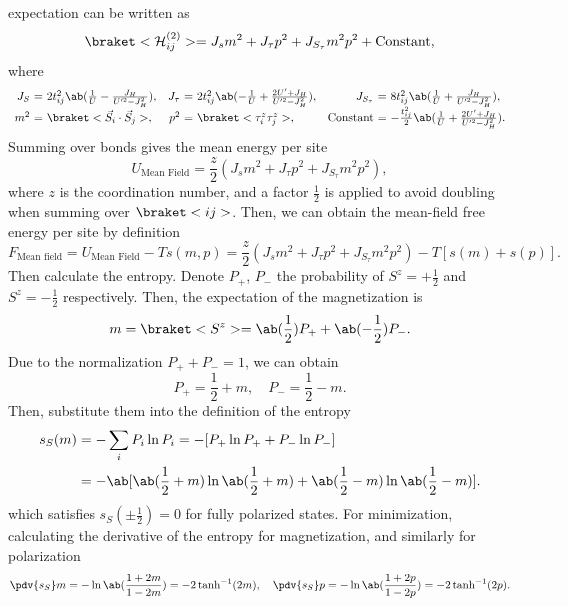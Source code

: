\begin{solution}
\begin{enumext}[label = \Roman*.]
\begin{enumext}[label = (\alph*)]
      expectation can be written as
      \[
        \braket<\mathcal H_{ij}^{(2)}>
      = J_s m^2 + J_\tau p^2 + J_{S_\tau} m^2p^2 + \text{Constant},
      \]
      where
      \[\begin{array}{*3{r@{~}c@{~}l}}
          J_S        & = & 2t_{ij}^2
                           \ab(\frac1U - \frac{J_H}{U'^2 - J_H^2}),       &
          J_\tau     & = & 2t_{ij}^2
                           \ab(-\frac1U + \frac{2U' + J_H}{U'^2 - J_H^2}),&
          J_{S_\tau} & = & 8t_{ij}^2
                           \ab(\frac1U + \frac{J_H}{U'^2 - J_H^2}),       \\
                 m^2 & = & \braket<\vec S_i \cdot \vec S_j>,              &
                 p^2 & = & \braket<\tau_i^z \tau_j^z>,                    &
     \text{Constant} & = &-\frac{t_{ij}^2}2
                           \ab(\frac 1U + \frac{2U' + J_H}{U'^2 - J_H^2}).
        \end{array}
      \]
      Summing over bonds gives the mean energy per site
      \[
        U_\text{Mean Field} = \frac{z}{2}
          (J_s m^2 + J_\tau p^2 + J_{S_\tau} m^2p^2),
      \]
      where $z$ is the coordination number, and a factor $\frac12$ is
      applied to avoid doubling when summing over $\braket<ij>$. Then, we can
      obtain the mean-field free energy per site by definition
      \[
        F_\text{Mean field} = U_\text{Mean Field} - Ts(m,p)
      = \frac z2 (J_s m^2 + J_\tau p^2 + J_{S_\tau} m^2p^2) - T[s(m) + s(p)].
      \]
      Then calculate the entropy. Denote $P_+$, $P_-$ the probability
      of $S^z = +\frac12$ and $S^z = -\frac12$ respectively. Then, the
      expectation of the magnetization is
      \[
        m = \braket<S^z> = \ab(\frac12)P_+ + \ab(-\frac12)P_-.
      \]
      Due to the normalization $P_+ + P_- = 1$, we can obtain
      \[
        P_+ = \frac12 + m, \quad P_- = \frac12 - m.
      \]
      Then, substitute them into the definition of the entropy
      \begin{align*}
        s_S(m) & = -\sum_i P_i \ln P_i
      = -[P_+\ln P_+ + P_-\ln P_-]\\
    & = -\ab[\ab(\frac12 + m) \ln\ab(\frac12 + m)
        + \ab(\frac12 - m) \ln\ab(\frac12 - m)].
      \end{align*}
      which satisfies $s_S(\pm\frac12) = 0$ for fully polarized states.
      For minimization, calculating the derivative of the entropy
      for magnetization, and similarly for polarization
      \[
        \pdv{s_S}m = -\ln\ab(\frac{1 + 2m}{1 - 2m}) = -2\tanh^{-1}(2m), \quad
        \pdv{s_S}p = -\ln\ab(\frac{1 + 2p}{1 - 2p}) = -2\tanh^{-1}(2p).
\]
\end{enumext}
\end{enumext}
\end{solution}
